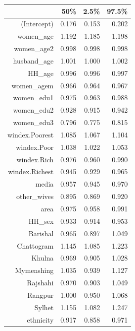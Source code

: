 \begin{table}[ht]
\centering
\begin{tabular}{rrrr}
  \hline
 & 50\% & 2.5\% & 97.5\% \\ 
  \hline
(Intercept) & 0.176 & 0.153 & 0.202 \\ 
  women\_age & 1.192 & 1.185 & 1.198 \\ 
  women\_age2 & 0.998 & 0.998 & 0.998 \\ 
  husband\_age & 1.001 & 1.000 & 1.002 \\ 
  HH\_age & 0.996 & 0.996 & 0.997 \\ 
  women\_agem & 0.966 & 0.964 & 0.967 \\ 
  women\_edu1 & 0.975 & 0.963 & 0.988 \\ 
  women\_edu2 & 0.928 & 0.915 & 0.942 \\ 
  women\_edu3 & 0.796 & 0.775 & 0.815 \\ 
  windex.Poorest & 1.085 & 1.067 & 1.104 \\ 
  windex.Poor & 1.038 & 1.022 & 1.053 \\ 
  windex.Rich & 0.976 & 0.960 & 0.990 \\ 
  windex.Richest & 0.945 & 0.929 & 0.965 \\ 
  media & 0.957 & 0.945 & 0.970 \\ 
  other\_wives & 0.895 & 0.869 & 0.920 \\ 
  area & 0.975 & 0.958 & 0.991 \\ 
  HH\_sex & 0.933 & 0.914 & 0.953 \\ 
  Barishal & 0.965 & 0.897 & 1.049 \\ 
  Chattogram & 1.145 & 1.085 & 1.223 \\ 
  Khulna & 0.969 & 0.905 & 1.028 \\ 
  Mymenshing & 1.035 & 0.939 & 1.127 \\ 
  Rajshahi & 0.970 & 0.903 & 1.049 \\ 
  Rangpur & 1.000 & 0.950 & 1.068 \\ 
  Sylhet & 1.155 & 1.082 & 1.247 \\ 
  ethnicity & 0.917 & 0.858 & 0.971 \\ 
   \hline
\end{tabular}
\end{table}
